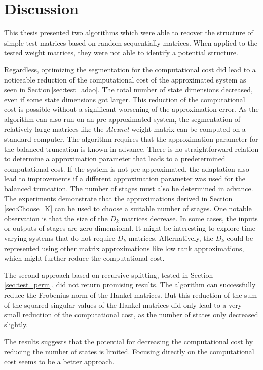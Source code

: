 \documentclass[numbers=noenddot,doctype=mastersthesis,BCOR=15mm,biblatex]{ldvbook}%
\begin{document}
\chapter{Discussion}\label{chap:discussion}
This thesis presented two algorithms which were able to recover the structure of simple test matrices based on random sequentially matrices.
When applied to the tested weight matrices, they were not able to identify a potential structure.

Regardless, optimizing the segmentation for the computational cost did lead to a noticeable reduction of the computational cost of the approximated system as seen in Section\,\ref{sec:test_adao}.
The total number of state dimensions decreased, even if some state dimensions got larger. 
This reduction of the computational cost is possible without a significant worsening of the approximation error. 
As the algorithm can also run on an pre-approximated system, the segmentation of relatively large matrices like the \emph{Alexnet} weight matrix can be computed on a standard computer.
The algorithm requires that the approximation parameter for the balanced truncation is known in advance.
There is no straightforward relation to determine a approximation parameter that leads to a predetermined computational cost.
If the system is not pre-approximated, the adaptation also lead to improvements if a different approximation parameter was used for the balanced truncation.
The number of stages must also be determined in advance.
The experiments demonstrate that the approximations derived in Section\,\ref{sec:Choose_K} can be used to choose a suitable number of stages.   
One notable observation is that the size of the $D_k$ matrices decrease.
In some cases, the inputs or outputs of stages are zero-dimensional.
It might be interesting to explore time varying systems that do not require $D_k$ matrices.
Alternatively, the $D_k$ could be represented using other matrix approximations like low rank approximations, which might further reduce the computational cost. 

The second approach based on recursive splitting, tested in Section\,\ref{sec:test_perm}, did not return promising results.
The algorithm can successfully reduce the Frobenius norm of the Hankel matrices.
But this reduction of the sum of the squared singular values of the Hankel matrices did only lead to a very small reduction of the computational cost, as the number of states only decreased slightly.


The results suggests that the potential for decreasing the computational cost by reducing the number of states is limited.
Focusing directly on the computational cost seems to be a better approach.
\end{document}
